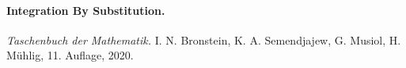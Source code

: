 \documentclass{article}
\begin{document}
\paragraph{Integration By Substitution.}





\begin{thebibliography}{9}
     \emph{Taschenbuch der Mathematik.}
    I. N. Bronstein, K. A. Semendjajew, G. Musiol, H. Mühlig, 11. Auflage, 2020.
\end{thebibliography}
\end{document}
